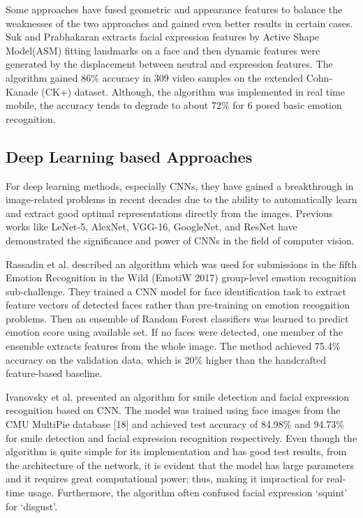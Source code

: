 \documentclass[master]{thesis-uestc}
\begin{document}
Some approaches have fused geometric and appearance features to balance the weaknesses of the two approaches and gained even better results in certain cases. Suk and Prabhakaran\cite{MSu14} extracts facial expression features by Active Shape Model(ASM) fitting landmarks on a face and then dynamic features were generated by the displacement between neutral and expression features. The algorithm gained 86\% accuracy in 309 video samples on the extended Cohn-Kanade (CK+) dataset\cite{5543262}. Although, the algorithm was implemented in real time mobile, the accuracy tends to degrade to about 72\% for 6 posed basic emotion recognition.

\subsection{Deep Learning based Approaches}
For deep learning methods, especially CNNs, they have gained a breakthrough in image-related problems in recent decades due to the ability to automatically learn and extract good optimal representations directly from the images. Previous works like LeNet-5\cite{YLe98}, AlexNet\cite{Kri12}, VGG-16\cite{Kar14}, GoogleNet\cite{Chr14}, and ResNet\cite{Kai15} have demonstrated the significance and power of CNNs in the field of computer vision.

Rassadin et al.\cite{DBLP:journals/corr/abs-1709-01688} described an algorithm which was used for submissions in the fifth Emotion Recognition in the Wild (EmotiW 2017) group-level emotion recognition sub-challenge. They trained a CNN model for face identification task to extract feature vectors of detected faces rather than pre-training on emotion recognition problems. Then an ensemble of Random Forest classifiers was learned to predict emotion score using available set. If no faces were detected, one member of the ensemble extracts features from the whole image. The method achieved 75.4\% accuracy on the validation data, which is 20\% higher than the handcrafted feature-based baseline.

Ivanovsky et al.\cite{Ivanovsky-2017} presented an algorithm for smile detection and facial expression recognition based on CNN. The model was trained using face images from the CMU MultiPie database [18] and achieved test accuracy of 84.98\% and 94.73\% for smile detection and facial expression recognition respectively. Even though the algorithm is quite simple for its implementation and has good test results, from the architecture of the network, it is evident that the model has large parameters and it requires great computational power; thus, making it impractical for real-time usage. Furthermore, the algorithm often confused facial expression `squint' for `disgust'.
\end{document}
